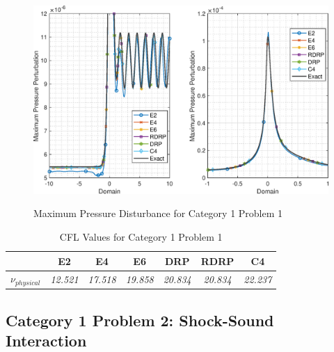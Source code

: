 \documentclass[conf]{new-aiaa}
\begin{document}
\begin{figure}[hbtp!]
	\centering
	{\includegraphics[width=1.0\textwidth]{C1P1_MaxDisturbance_zoom}}
	\caption{Maximum Pressure Disturbance for Category 1 Problem 1}
	\label{fig:Unsteady_C1P1_closeup}
\end{figure}

\begin{table}[htp!]
\centering
\caption{CFL Values for Category 1 Problem 1}
\label{tab:C1P1_CFL}
\begin{tabular}{|l|c|c|c|c|c|c|}
\hline
 & \multicolumn{1}{c|}{\textbf{E2}} & \multicolumn{1}{c|}{\textbf{E4}} & \multicolumn{1}{c|}{\textbf{E6}} & \multicolumn{1}{c|}{\textbf{DRP}} & \multicolumn{1}{c|}{\textbf{RDRP}}& \multicolumn{1}{c|}{\textbf{C4}}\\ \hline
\textbf{$\nu_{physical}$} & \textit{12.521} & \textit{17.518} & \textit{19.858} & \textit{20.834} & \textit{20.834} & \textit{22.237}\\ \hline
\end{tabular}
\end{table}



\subsection{Category 1 Problem 2: Shock-Sound Interaction}
\end{document}
